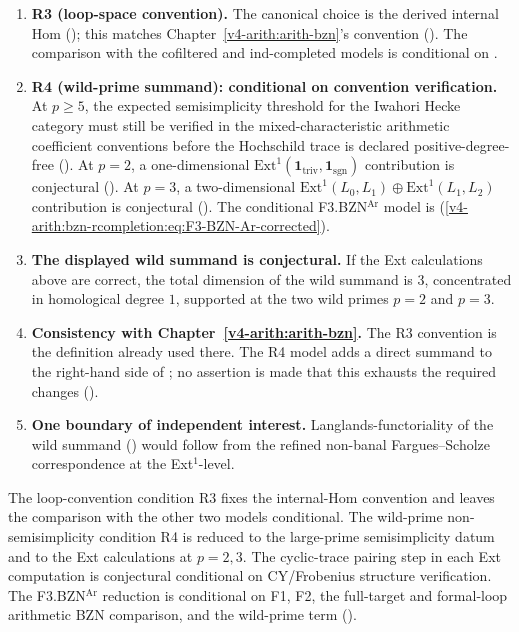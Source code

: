 \begin{enumerate}
\item \textbf{R3 (loop-space convention).}
The canonical choice is the derived internal Hom
(); this
matches Chapter~\ref{v4-arith:arith-bzn}'s convention
(). The
comparison with the cofiltered and ind-completed models is conditional
on .
\item \textbf{R4 (wild-prime summand): conditional on convention verification.}
At \(p\geq 5\), the expected semisimplicity threshold for the Iwahori
Hecke category must still be verified in the mixed-characteristic
arithmetic coefficient conventions before the Hochschild trace is
declared positive-degree-free
().
At \(p=2\), a one-dimensional
\(\mathrm{Ext}^{1}(\mathbf{1}_{\mathrm{triv}},\mathbf{1}_{\mathrm{sgn}})\)
contribution is conjectural
(). At \(p=3\), a
two-dimensional
\(\mathrm{Ext}^{1}(L_{0},L_{1})\oplus\mathrm{Ext}^{1}(L_{1},L_{2})\)
contribution is conjectural
(). The conditional
F3.BZN\({}^{\mathrm{Ar}}\) model is
(\ref{v4-arith:bzn-rcompletion:eq:F3-BZN-Ar-corrected}).
\item \textbf{The displayed wild summand is conjectural.} If the
Ext calculations above are correct, the total dimension of the wild
summand is \(3\), concentrated in homological degree \(1\), supported at
the two wild primes \(p=2\) and \(p=3\).
\item \textbf{Consistency with Chapter~\ref{v4-arith:arith-bzn}.}
The R3 convention is the definition already used there. The R4
model adds a direct summand to the right-hand side of
; no assertion is made that this exhausts
the required changes
().
\item \textbf{One boundary of independent interest.}
Langlands-functoriality of the wild summand
()
would follow from the refined non-banal Fargues--Scholze correspondence at the
Ext\({}^{1}\)-level.
\end{enumerate}

The loop-convention condition R3 fixes the internal-Hom convention
and leaves the comparison with the other two models conditional.
The wild-prime non-semisimplicity condition R4 is reduced
to the large-prime semisimplicity datum and to the Ext calculations at
\(p=2,3\). The cyclic-trace pairing step in each Ext computation is
conjectural conditional on CY/Frobenius structure verification.
The F3.BZN\({}^{\mathrm{Ar}}\) reduction is conditional on F1, F2, the
full-target and formal-loop arithmetic BZN comparison, and the wild-prime term
().
